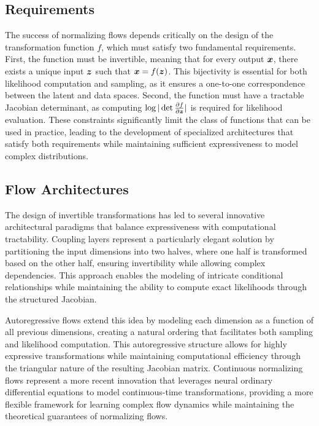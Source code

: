 \subsection{Requirements}

The success of normalizing flows depends critically on the design of the transformation function $f$, which must satisfy two fundamental requirements. First, the function must be invertible, meaning that for every output $\boldsymbol{x}$, there exists a unique input $\boldsymbol{z}$ such that $\boldsymbol{x} = f(\boldsymbol{z})$. This bijectivity is essential for both likelihood computation and sampling, as it ensures a one-to-one correspondence between the latent and data spaces. Second, the function must have a tractable Jacobian determinant, as computing $\log|\det \frac{\partial f}{\partial \boldsymbol{z}}|$ is required for likelihood evaluation. These constraints significantly limit the class of functions that can be used in practice, leading to the development of specialized architectures that satisfy both requirements while maintaining sufficient expressiveness to model complex distributions.

\subsection{Flow Architectures}

The design of invertible transformations has led to several innovative architectural paradigms that balance expressiveness with computational tractability. Coupling layers represent a particularly elegant solution by partitioning the input dimensions into two halves, where one half is transformed based on the other half, ensuring invertibility while allowing complex dependencies. This approach enables the modeling of intricate conditional relationships while maintaining the ability to compute exact likelihoods through the structured Jacobian.

Autoregressive flows extend this idea by modeling each dimension as a function of all previous dimensions, creating a natural ordering that facilitates both sampling and likelihood computation. This autoregressive structure allows for highly expressive transformations while maintaining computational efficiency through the triangular nature of the resulting Jacobian matrix. Continuous normalizing flows represent a more recent innovation that leverages neural ordinary differential equations to model continuous-time transformations, providing a more flexible framework for learning complex flow dynamics while maintaining the theoretical guarantees of normalizing flows.


